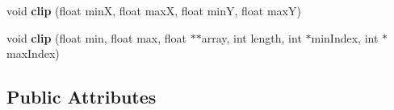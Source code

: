 \begin{DoxyCompactItemize}
\item 
\hypertarget{classSWE__TsunamiScenario_adba5fd0a38464051ffec4d388e97e85d}{void {\bfseries clip} (float min\-X, float max\-X, float min\-Y, float max\-Y)}\label{classSWE__TsunamiScenario_adba5fd0a38464051ffec4d388e97e85d}

\item 
\hypertarget{classSWE__TsunamiScenario_a39bddfedf0a8e2621cc4d0ed0a789304}{void {\bfseries clip} (float min, float max, float $\ast$$\ast$array, int length, int $\ast$min\-Index, int $\ast$max\-Index)}\label{classSWE__TsunamiScenario_a39bddfedf0a8e2621cc4d0ed0a789304}

\end{DoxyCompactItemize}
\subsection*{Public Attributes}
